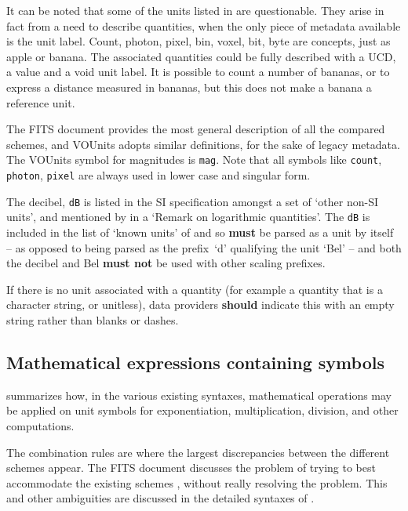 \documentclass[11pt,a4paper]{ivoa}
\newcommand{\unit}[1]{\texttt{\small\color{orange}#1}}
\newcommand*\norm[1]{\textbf{\color{ivoacolor}#1}}
\begin{document}
It can be noted that some of the units listed in  are 
questionable. They arise in fact from a need to describe quantities, when the only
piece of metadata available is the unit label. Count, photon, pixel, bin, voxel, bit,
byte are concepts, just as apple or banana. The associated quantities could be fully
described with a UCD, a value and a void unit label.
It is possible to count a number of bananas, or to express a distance measured in
bananas, but this does not make a banana a reference unit.

The FITS document provides the most general description of all the compared schemes, 
and VOUnits adopts similar definitions, for the sake of legacy metadata.
The VOUnits symbol for magnitudes is \unit{mag}.
Note that all symbols like \unit{count}, \unit{photon}, \unit{pixel}
are always used in lower case and singular form.

The decibel, \unit{dB} is listed in the SI specification
\citep[Table 8]{si-brochure} amongst a set of `other non-SI units',
and mentioned by \citet[\S0.5]{std:iso80000-3} in a `Remark on
logarithmic quantities'.  The \unit{dB} is included in the list of
`known units' of  and so \norm{must} be parsed as a
unit by itself -- as opposed to being parsed as the prefix~`d'
qualifying the unit `Bel' -- and both the decibel and Bel \norm{must
not} be used with other scaling prefixes.

If there is no unit associated with a quantity (for example a quantity
that is a character string, or unitless), data providers \norm{should}
indicate this with an empty string rather than blanks or dashes.



\subsection{Mathematical expressions containing symbols}

 summarizes how, 
in the various existing syntaxes, mathematical operations may
be applied on unit symbols for exponentiation, multiplication,
division, and other computations.

The combination rules are where the largest discrepancies between the
different schemes appear. The FITS document discusses the problem of
trying to best accommodate the existing schemes
\cite[\S4.3.1]{pence10}, without really resolving the problem.
\label{sec:fitsquote}
This and other ambiguities are discussed in the detailed syntaxes of .
\end{document}
